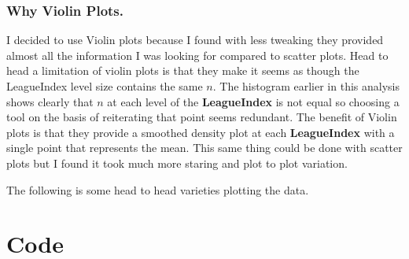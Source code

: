 \documentclass[]{article}
\begin{document}
\hypertarget{why-violin-plots.}{%
\subsubsection{Why Violin Plots.}\label{why-violin-plots.}}

I decided to use Violin plots because I found with less tweaking they
provided almost all the information I was looking for compared to
scatter plots. Head to head a limitation of violin plots is that they
make it seems as though the LeagueIndex level size contains the same
\(n\). The histogram earlier in this analysis shows clearly that \(n\)
at each level of the \textbf{LeagueIndex} is not equal so choosing a
tool on the basis of reiterating that point seems redundant. The benefit
of Violin plots is that they provide a smoothed density plot at each
\textbf{LeagueIndex} with a single point that represents the mean. This
same thing could be done with scatter plots but I found it took much
more staring and plot to plot variation.

The following is some head to head varieties plotting the data.

\hypertarget{code}{%
\section{Code}\label{code}}
\end{document}
